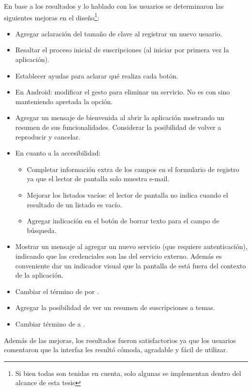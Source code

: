 En base a los resultados y lo hablado con los usuarios se determinaron las siguientes mejoras en el diseño\footnote{Si bien todas son tenidas en cuenta, solo algunas se implementan dentro del alcance de esta tesis}:
\begin{itemize}
\item Agregar aclaración del tamaño de clave al registrar un nuevo usuario. 
\item Resaltar el proceso inicial de suscripciones (al iniciar por primera vez la aplicación).
\item Establecer ayudas para aclarar qué realiza cada botón.
\item En Android: modificar el gesto para eliminar un servicio. No es con  sino manteniendo apretada la opción.
\item Agregar un mensaje de bienvenida al abrir la aplicación mostrando un resumen de sus funcionalidades. Considerar la posibilidad de volver a reproducir y cancelar.
\item En cuanto a la accesibilidad:
\begin{itemize}
\item Completar información extra de los campos en el formulario de registro ya que el lector de pantalla solo muestra e-mail.
\item Mejorar los listados vacíos: el lector de pantalla no indica cuando el resultado de un listado es vacío.
\item Agregar indicación en el botón de borrar texto para el campo de búsqueda. 
\end{itemize}
\item Mostrar un mensaje al agregar un nuevo servicio (que requiere autenticación), indicando que las credenciales son las del servicio externo. Además es conveniente dar un indicador visual que la pantalla de   está fuera del contexto de la aplicación.
\item Cambiar el término de  por .
\item Agregar la posibilidad de ver un resumen de suscripciones a temas.
\item Cambiar término de  a .
\end{itemize}

Además de las mejoras, los resultados fueron satisfactorios ya que los usuarios comentaron que la interfaz les resultó cómoda, agradable y fácil de utilizar.
